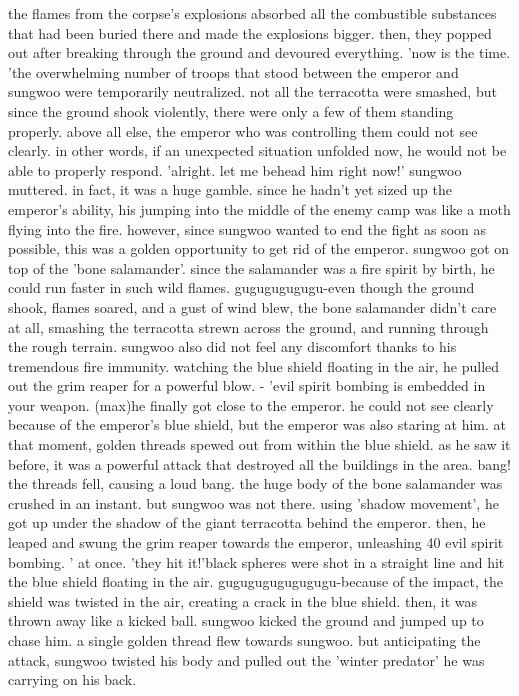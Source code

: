 the flames from the corpse's explosions absorbed all the combustible substances that had been buried there and made the explosions bigger.
 then, they popped out after breaking through the ground and devoured everything.
'now is the time.
'the overwhelming number of troops that stood between the emperor and sungwoo were temporarily neutralized.
 not all the terracotta were smashed, but since the ground shook violently, there were only a few of them standing properly.
 above all else, the emperor who was controlling them could not see clearly.
 in other words, if an unexpected situation unfolded now, he would not be able to properly respond.
'alright.
 let me behead him right now!' sungwoo muttered.
in fact, it was a huge gamble.
 since he hadn't yet sized up the emperor's ability, his jumping into the middle of the enemy camp was like a moth flying into the fire.
however, since sungwoo wanted to end the fight as soon as possible, this was a golden opportunity to get rid of the emperor.
sungwoo got on top of the 'bone salamander'.
 since the salamander was a fire spirit by birth, he could run faster in such wild flames.
gugugugugugu-even though the ground shook, flames soared, and a gust of wind blew, the bone salamander didn't care at all, smashing the terracotta strewn across the ground, and running through the rough terrain.
sungwoo also did not feel any discomfort thanks to his tremendous fire immunity.
watching the blue shield floating in the air, he pulled out the grim reaper for a powerful blow.
- 'evil spirit bombing is embedded in your weapon.
 (max)he finally got close to the emperor.
 he could not see clearly because of the emperor's blue shield, but the emperor was also staring at him.
at that moment, golden threads spewed out from within the blue shield.
as he saw it before, it was a powerful attack that destroyed all the buildings in the area.
bang!
the threads fell, causing a loud bang.
 the huge body of the bone salamander was crushed in an instant.
 but sungwoo was not there.
 using 'shadow movement', he got up under the shadow of the giant terracotta behind the emperor.
 then, he leaped and swung the grim reaper towards the emperor, unleashing 40 evil spirit bombing.
' at once.
'they hit it!'black spheres were shot in a straight line and hit the blue shield floating in the air.
gugugugugugugugu-because of the impact, the shield was twisted in the air, creating a crack in the blue shield.
then, it was thrown away like a kicked ball.
 sungwoo kicked the ground and jumped up to chase him.
a single golden thread flew towards sungwoo.
 but anticipating the attack, sungwoo twisted his body and pulled out the 'winter predator' he was carrying on his back.
